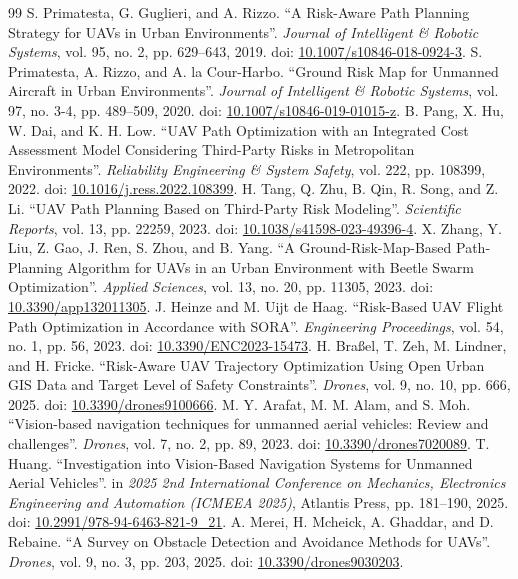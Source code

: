 \documentclass[a4paper,11pt]{article}
\begin{document}
\begin{thebibliography}{99}
S. Primatesta, G. Guglieri, and A. Rizzo. ``A Risk-Aware Path Planning Strategy for UAVs in Urban Environments''. \emph{Journal of Intelligent \& Robotic Systems}, vol. 95, no. 2, pp. 629--643, 2019. doi: \url{10.1007/s10846-018-0924-3}.
S. Primatesta, A. Rizzo, and A. la Cour-Harbo. ``Ground Risk Map for Unmanned Aircraft in Urban Environments''. \emph{Journal of Intelligent \& Robotic Systems}, vol. 97, no. 3-4, pp. 489--509, 2020. doi: \url{10.1007/s10846-019-01015-z}.
B. Pang, X. Hu, W. Dai, and K. H. Low. ``UAV Path Optimization with an Integrated Cost Assessment Model Considering Third-Party Risks in Metropolitan Environments''. \emph{Reliability Engineering \& System Safety}, vol. 222, pp. 108399, 2022. doi: \url{10.1016/j.ress.2022.108399}.
H. Tang, Q. Zhu, B. Qin, R. Song, and Z. Li. ``UAV Path Planning Based on Third-Party Risk Modeling''. \emph{Scientific Reports}, vol. 13, pp. 22259, 2023. doi: \url{10.1038/s41598-023-49396-4}.
X. Zhang, Y. Liu, Z. Gao, J. Ren, S. Zhou, and B. Yang. ``A Ground-Risk-Map-Based Path-Planning Algorithm for UAVs in an Urban Environment with Beetle Swarm Optimization''. \emph{Applied Sciences}, vol. 13, no. 20, pp. 11305, 2023. doi: \url{10.3390/app132011305}.
J. Heinze and M. Uijt de Haag. ``Risk-Based UAV Flight Path Optimization in Accordance with SORA''. \emph{Engineering Proceedings}, vol. 54, no. 1, pp. 56, 2023. doi: \url{10.3390/ENC2023-15473}.
H. Bra{\ss}el, T. Zeh, M. Lindner, and H. Fricke. ``Risk-Aware UAV Trajectory Optimization Using Open Urban GIS Data and Target Level of Safety Constraints''. \emph{Drones}, vol. 9, no. 10, pp. 666, 2025. doi: \url{10.3390/drones9100666}.
M. Y. Arafat, M. M. Alam, and S. Moh. ``Vision-based navigation techniques for unmanned aerial vehicles: Review and challenges''. \emph{Drones}, vol. 7, no. 2, pp. 89, 2023. doi: \url{10.3390/drones7020089}.
T. Huang. ``Investigation into Vision-Based Navigation Systems for Unmanned Aerial Vehicles''. in \emph{2025 2nd International Conference on Mechanics, Electronics Engineering and Automation (ICMEEA 2025)}, Atlantis Press, pp. 181--190, 2025. doi: \url{10.2991/978-94-6463-821-9_21}.
A. Merei, H. Mcheick, A. Ghaddar, and D. Rebaine. ``A Survey on Obstacle Detection and Avoidance Methods for UAVs''. \emph{Drones}, vol. 9, no. 3, pp. 203, 2025. doi: \url{10.3390/drones9030203}.

\end{thebibliography}
\end{document}
